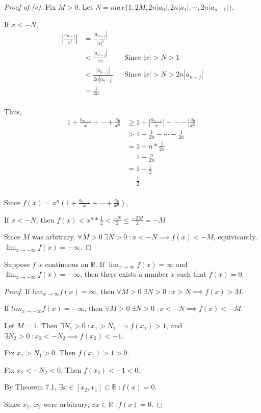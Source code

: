 \documentclass{article} %
\theoremstyle{plain}
\theoremstyle{definition}
\newcommand{\Rb}{\mathbb{R}}
\begin{document}
\begin{proof}[Proof of (c)] 
    Fix $M > 0$. Let $N = max\{1, 2M, 2n|a_0|, 2n|a_1|, \cdots, 2n|a_{n-1}| \}$. 

    If $x < -N$,
    \begin{align*}
        | \frac{a_{n-j}}{x^j} | & = \frac{|a_{n-j}|}{|x|^j} & & \\
        & < \frac{|a_{n-j}|}{|x|} & & \text{Since $|x| > N > 1$} \\
        & < \frac{|a_{n-j}|}{2n|a_{n-j}|} & & \text{Since $|x| > N > 2n|a_{n-j}|$} \\
        & = \frac{1}{2n} & & \\
    \end{align*}

    Thus,
    \begin{align*}
        1 + \frac{a_{n-1}}{x} + \cdots + \frac{a_0}{x^n} & \geq 1 - |\frac{a_{n-1}}{x}| - \cdots - |\frac{a_0}{x^n}| \\
        & > 1 - \frac{1}{2n} - \cdots - \frac{1}{2n} \\
        & = 1 - n * \frac{1}{2n} \\
        & = 1 - \frac{n}{2n} \\
        & = 1 - \frac{1}{2} \\
        & = \frac{1}{2} \\
    \end{align*}

    Since $f(x) = x^n(1 + \frac{a_{n-1}}{x} + \cdots + \frac{a_0}{x^n})$,

    If $x < -N$, then $f(x) < x^n * \frac{1}{2} < \frac{-N}{2} \leq \frac{-2M}{2} = -M$

    Since $M$ was arbitrary, $\forall M > 0 \; \exists N > 0 \; \colon x < -N \implies f(x) < -M$, equivicantly, $\lim_{x \to -\infty} f(x) = -\infty$.

\end{proof} 

\noindent{} Suppose $f$ is continuous on $\Rb$. If $\lim_{x \rightarrow\infty} f(x) = \infty$ and $\lim_{x \rightarrow -\infty} f(x)=-\infty$, then there exists a number $x$ such that $f(x)=0$. 

\begin{proof} 
    If $lim_{x \to \infty} f(x) = \infty$, then $\forall M > 0 \; \exists N > 0 \; \colon x > N \implies f(x) > M$.

    If $lim_{x \to -\infty} f(x) = -\infty$, then $\forall M > 0 \; \exists N > 0 \; \colon x < -N \implies f(x) < -M$.

    Let $M = 1$.  Then $\exists N_1 > 0 \; \colon x_1 > N_1 \implies f(x_1) > 1$, and $\exists N_2 > 0 \; \colon x_2 < -N_2 \implies f(x_2) < -1$.

    Fix $x_1 > N_1 > 0$.  Then $f(x_1) > 1 > 0$.

    Fix $x_2 < -N_2 < 0$.  Then $f(x_2) < -1 < 0$.

    By Theorem 7.1, $\exists x \in [x_2, x_1] \subset \mathbb{R} \; \colon f(x) = 0$.

    Since $x_1$, $x_2$ were arbitrary, $\exists x \in \mathbb{R} \; \colon f(x) = 0$.
    
\end{proof} 
\end{document}
